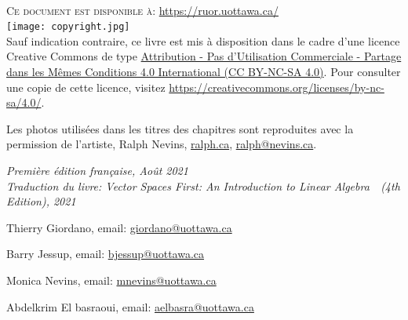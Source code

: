 \documentclass[11pt,french]{book} %
\begin{document}

\newpage
~\vfill
\thispagestyle{empty}


\noindent \textsc{Ce document est disponible \`a:} \href{https://ruor.uottawa.ca/handle/10393/43430?locale=fr}{https://ruor.uottawa.ca/}\\%


\noindent \texttt{[image: copyright.jpg]}\\ %



\noindent Sauf indication contraire, ce livre est mis à disposition dans le cadre d'une licence Creative Commons de type \href{https://creativecommons.org/licenses/by-nc-sa/4.0/}{Attribution - Pas d’Utilisation Commerciale - Partage dans les Mêmes Conditions 4.0 International (CC BY-NC-SA 4.0)}.  Pour consulter une copie de cette licence, visitez \url{https://creativecommons.org/licenses/by-nc-sa/4.0/}.

Les photos utilisées dans les titres des chapitres sont reproduites avec la permission de l'artiste, Ralph Nevins, \url{ralph.ca}, \href{mailto:ralph@nevins.ca}{ralph@nevins.ca}.

\vspace*{1in}

\noindent \textit{Premi\`ere \'edition fran\c{c}aise, Août 2021}\\
\textit{Traduction du livre: \og Vector Spaces First: An Introduction to Linear Algebra\ \fg\ (4th Edition), 2021}


\smallskip
Thierry Giordano, email:
\href{mailto:giordano@uottawa.ca}{giordano@uottawa.ca}



\smallskip
Barry Jessup, email:
\href{mailto:bjessup@uottawa.ca}{bjessup@uottawa.ca}


\smallskip

Monica Nevins, email:
\href{mailto:mnevins@uottawa.ca}{mnevins@uottawa.ca}

\smallskip
Abdelkrim El basraoui, email:
\href{mailto:aelbasra@uottawa.ca}{aelbasra@uottawa.ca}



\end{document}
